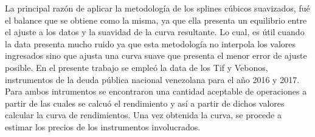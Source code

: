 \hspace{0.4cm} La principal raz\'on de aplicar la metodolog\'ia de los splines c\'ubicos suavizados, fu\'e el balance que se obtiene como la misma, ya que ella presenta un equilibrio entre el ajuste a los datos y la suavidad de la curva resultante. Lo cual, es \'util cuando la data presenta mucho ruido ya que esta metodolog\'ia no interpola los valores ingresados sino que ajusta una curva suave que presenta el menor error de ajuste posible. En el presente trabajo se emple\'o la data de los Tif y Vebonos, instrumentos de la deuda p\'ublica nacional venezolana para el a\~no 2016 y 2017. Para ambos intrumentos se encontraron una cantidad aceptable de operaciones a partir de las cuales se calcu\'o el rendimiento y as\'i a partir de dichos valores calcular la curva de rendimientos. Una vez obtenida la curva, se procede a estimar los precios de los instrumentos involucrados.
